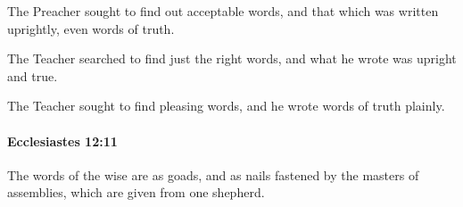 			\begin{versebox}
					\item[BHS] 
					\item[LXX] 
					\item[ASV] The Preacher sought to find out acceptable words, and that which was written uprightly, even words of truth.
					\item[NIV] The Teacher searched to find just the right words, and what he wrote was upright and true.
					\item[NRSV] The Teacher sought to find pleasing words, and he wrote words of truth plainly.
			\end{versebox}

		\paragraph{Ecclesiastes 12:11} %
			\label{ECCLESIASTES-12-11}

			The words of the wise are as goads, and as nails fastened by the masters of assemblies, which are given from one shepherd.

